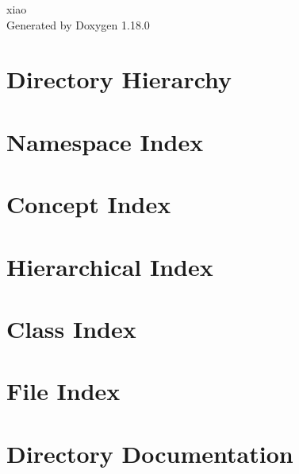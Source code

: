 \documentclass[twoside]{book}
\newcommand{\+}{\discretionary{\mbox{\scriptsize$\hookleftarrow$}}{}{}}
\newcommand{\clearemptydoublepage}{%
    \newpage{\pagestyle{empty}\cleardoublepage}%
  }
\begin{document}
  \raggedbottom
    \hypersetup{pageanchor=false,
                bookmarksnumbered=true,
                pdfencoding=unicode
               }
  \begin{titlepage}
  \vspace*{7cm}
  \begin{center}%
  {\Large xiao}\\
  \vspace*{1cm}
  {\large Generated by Doxygen 1.18.0}\\
  \end{center}
  \end{titlepage}
  \clearemptydoublepage
  \tableofcontents
  \clearemptydoublepage
  \hypersetup{pageanchor=true}
\chapter{Directory Hierarchy}

\chapter{Namespace Index}

\chapter{Concept Index}

\chapter{Hierarchical Index}

\chapter{Class Index}

\chapter{File Index}

\chapter{Directory Documentation}








\end{document}

